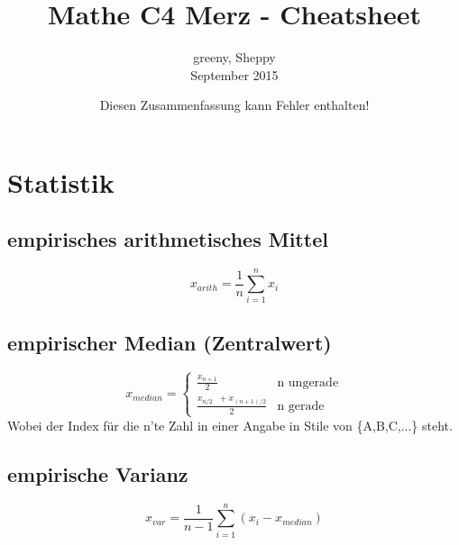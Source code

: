 \documentclass{article}
\title{Mathe C4 Merz - Cheatsheet}
\author{greeny, Sheppy\\September 2015}
\date{Diesen Zusammenfassung kann Fehler enthalten!}
\begin{document}
\maketitle
\section{Statistik}
\subsection{empirisches arithmetisches Mittel}
\[x_{arith}=\frac{1}{n}\sum_{i=1}^n x_i\]
\subsection{empirischer Median (Zentralwert)}
\[
	x_{median}=
	\begin{cases}
		\frac{x_{n+1}}{2}								& \text{n ungerade} \\
		\frac{x_{n/2} \;\; + x_{(n+1)/2}}{2}	& \text{n gerade}
	\end{cases}
\]
Wobei der Index f\"ur die n'te Zahl in einer Angabe in Stile von \{A,B,C,...\} steht.
\subsection{empirische Varianz}
\[x_{var}=\frac{1}{n-1}\sum_{i=1}^n (x_i-x_{median})\]
%
\end{document}
